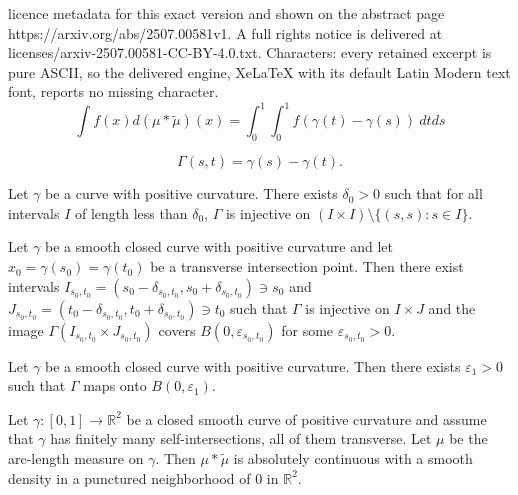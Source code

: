 \documentclass[10pt,a4paper]{amsart}
\newcommand{\RR}{{\mathbb R}}
\newcommand{\wt}[1]{\widetilde{#1}}
\begin{document}
licence metadata for this exact version and shown on the abstract page https://arxiv.org/abs/2507.00581v1. A full rights notice is delivered at licenses/arxiv-2507.00581-CC-BY-4.0.txt. Characters: every retained excerpt is pure ASCII, so the delivered engine, XeLaTeX with its default Latin Modern text font, reports no missing character.
\begin{equation}\label{eq-auto-correlation}
\int f(x)d(\mu\ast\wt{\mu})(x) = \int_0^1\int_0^1 f(\gamma(t)-\gamma(s))~dtds
\end{equation}

\begin{equation}\label{eq-Gamma(s,t)}
\Gamma (s,t) = \gamma(s)-\gamma(t). 
\end{equation}

\begin{lemma}\label{lemma_self}
    Let $\gamma$ be a curve with positive curvature. There exists $\delta_0>0$ such that for all intervals $I$ of length less than $\delta_0$, $\Gamma$ is injective on $(I\times I)\setminus\{(s,s):s\in I\}$.
\end{lemma}

\begin{lemma}\label{lemma-tranverse}
    Let $\gamma$ be a smooth closed curve with positive curvature and let $x_0 = \gamma(s_0) = \gamma(t_0)$ be a transverse intersection point. Then there exist intervals $I_{s_0,t_0} = (s_0-\delta_{s_0,t_0},s_0+\delta_{s_0,t_0})\ni s_0$ and $J_{s_0,t_0}=(t_0-\delta_{s_0,t_0},t_0+\delta_{s_0,t_0})\ni t_0$ such that $\Gamma$ is injective on $I\times J$ and the image $\Gamma(I_{s_0,t_0}\times J_{s_0,t_0})$ covers $B(0, \varepsilon_{s_0,t_0})$ for some $\varepsilon_{s_0,t_0}>0$. 
\end{lemma}

\begin{lemma}\label{lemma-ball cover}
    Let $\gamma$ be a smooth closed curve with positive curvature. Then there exists $\varepsilon_1>0$ such that $\Gamma$ maps  onto $B(0,\varepsilon_1)$. 
\end{lemma}

\begin{theorem}\label{theorem-smooth}
    Let $\gamma: [0,1]\to \RR^2$ be a closed smooth curve of positive curvature and {assume that} $\gamma$ has {finitely many self-intersections, all of them transverse}. Let $\mu$ be the arc-length measure on $\gamma$. Then $\mu\ast\wt\mu$ is absolutely continuous with a smooth density in a {punctured} neighborhood of $0$ in $\RR^2$. 
\end{theorem}
\end{document}
